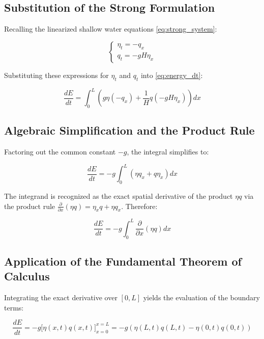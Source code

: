 \subsection{Substitution of the Strong Formulation}

Recalling the linearized shallow water equations \eqref{eq:strong_system}:

\begin{equation}
\begin{cases}
\eta_{t} = -q_{x} \\
q_{t} = -gH\eta_{x}
\end{cases}
\label{eq:strong_substituted}
\end{equation}

Substituting these expressions for \(\eta_t\) and \(q_t\) into \eqref{eq:energy_dt}:

\begin{equation}
\frac{dE}{dt} = \int_{0}^{L} \left( g \eta (-q_x) + \frac{1}{H} q (-gH\eta_x) \right) dx
\end{equation}

\subsection{Algebraic Simplification and the Product Rule}

Factoring out the common constant \(-g\), the integral simplifies to:

\begin{equation}
\frac{dE}{dt} = -g \int_{0}^{L} \left( \eta q_x + q \eta_x \right) dx
\end{equation}

The integrand is recognized as the exact spatial derivative of the product \(\eta q\) via the product rule \(\frac{\partial}{\partial x}(\eta q) = \eta_x q + \eta q_x\). Therefore:

\begin{equation}
\frac{dE}{dt} = -g \int_{0}^{L} \frac{\partial}{\partial x} (\eta q) dx
\end{equation}

\subsection{Application of the Fundamental Theorem of Calculus}

Integrating the exact derivative over \([0,L]\) yields the evaluation of the boundary terms:

\begin{equation}
\frac{dE}{dt} = -g \Big[ \eta(x,t) q(x,t) \Big]_{x=0}^{x=L} = -g \left( \eta(L,t)q(L,t) - \eta(0,t)q(0,t) \right)
\end{equation}

